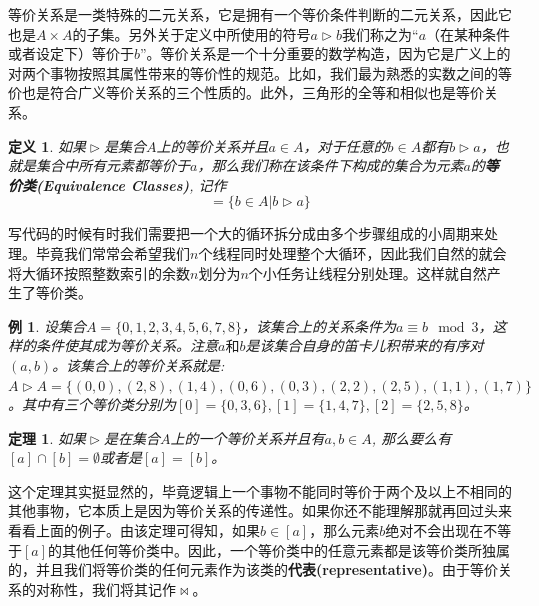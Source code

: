 \documentclass[mathserif,hyperref,UTF8,openany,b5paper]{ctexbook}
\newtheorem{exmp}{例}[section]
\newtheorem{defn}{定义}[section]
\newtheorem{thm}{定理}[section]
\begin{document}
等价关系是一类特殊的二元关系，它是拥有一个等价条件判断的二元关系，因此它也是$A\times A$的子集。另外关于定义中所使用的符号$a\vartriangleright b$我们称之为“$a$（在某种条件或者设定下）等价于$b$”。等价关系是一个十分重要的数学构造，因为它是广义上的对两个事物按照其属性带来的等价性的规范。比如，我们最为熟悉的实数之间的等价也是符合广义等价关系的三个性质的。此外，三角形的全等和相似也是等价关系。

\begin{defn}
如果$ \vartriangleright $是集合$A$上的等价关系并且$a\in A$，对于任意的$b \in A$都有$ b \vartriangleright a$，也就是集合中所有元素都等价于$a$，那么我们称在该条件下构成的集合为元素$a$的\textbf{等价类(Equivalence Classes)}, 记作\begin{equation}
    [a]=\{b\in A | b \vartriangleright a\} 
\end{equation}
\end{defn}

写代码的时候有时我们需要把一个大的循环拆分成由多个步骤组成的小周期来处理。毕竟我们常常会希望我们$n$个线程同时处理整个大循环，因此我们自然的就会将大循环按照整数索引的余数$n$划分为$n$个小任务让线程分别处理。这样就自然产生了等价类。

\begin{exmp}
设集合$A=\{0, 1, 2, 3, 4, 5, 6, 7, 8\}$，该集合上的关系条件为$a \equiv b \mod{3} $，这样的条件使其成为等价关系。注意$a和b$是该集合自身的笛卡儿积带来的有序对$(a,b)$。该集合上的等价关系就是:\\$A \vartriangleright A = \{(0, 0), (2, 8), (1, 4), (0, 6), (0, 3), (2, 2), (2, 5), (1, 1), (1, 7)\} $ 。其中有三个等价类分别为$[0]=\{0,3,6\},[1]=\{1,4,7\},[2]=\{2,5,8\}$。
\end{exmp}

\begin{thm}
如果$\vartriangleright$是在集合$A$上的一个等价关系并且有$a,b \in A$, 那么要么有$[a] \cap [b]=\emptyset$或者是$[a]=[b]$。
\end{thm}

这个定理其实挺显然的，毕竟逻辑上一个事物不能同时等价于两个及以上不相同的其他事物，它本质上是因为等价关系的传递性。如果你还不能理解那就再回过头来看看上面的例子。由该定理可得知，如果$b \in [a]$，那么元素$b$绝对不会出现在不等于$[a]$的其他任何等价类中。因此，一个等价类中的任意元素都是该等价类所独属的，并且我们将等价类的任何元素作为该类的\textbf{代表(representative)}。由于等价关系的对称性，我们将其记作$\bowtie$。
\end{document}
